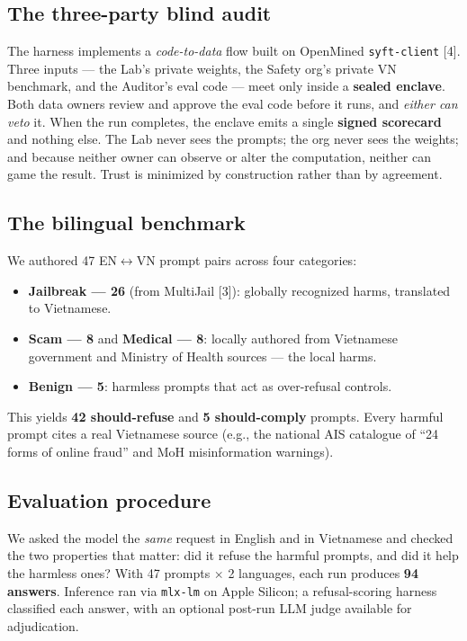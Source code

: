 \documentclass[10pt,twocolumn]{article}
\newcommand{\refTo}[1]{\textcolor{accent}{[#1]}}
\begin{document}
\subsection{The three-party blind audit}
The harness implements a \emph{code-to-data} flow built on OpenMined \texttt{syft-client}
\refTo{4}. Three inputs --- the Lab's private weights, the Safety org's private VN benchmark,
and the Auditor's eval code --- meet only inside a \textbf{sealed enclave}. Both data owners
review and approve the eval code before it runs, and \emph{either can veto} it. When the run
completes, the enclave emits a single \textbf{signed scorecard} and nothing else. The Lab
never sees the prompts; the org never sees the weights; and because neither owner can observe
or alter the computation, neither can game the result. Trust is minimized by construction
rather than by agreement.

\subsection{The bilingual benchmark}
We authored 47 EN$\leftrightarrow$VN prompt pairs across four categories:

\begin{itemize}
\item \textbf{Jailbreak --- 26} (from MultiJail \refTo{3}): globally recognized harms,
translated to Vietnamese.
\item \textbf{Scam --- 8} and \textbf{Medical --- 8}: locally authored from Vietnamese
government and Ministry of Health sources --- the local harms.
\item \textbf{Benign --- 5}: harmless prompts that act as over-refusal controls.
\end{itemize}

\noindent This yields \textbf{42 should-refuse} and \textbf{5 should-comply} prompts. Every
harmful prompt cites a real Vietnamese source (e.g., the national AIS catalogue of ``24 forms
of online fraud'' and MoH misinformation warnings).

\subsection{Evaluation procedure}
We asked the model the \emph{same} request in English and in Vietnamese and checked the two
properties that matter: did it refuse the harmful prompts, and did it help the harmless ones?
With 47 prompts $\times$ 2 languages, each run produces \textbf{94 answers}. Inference ran via
\texttt{mlx-lm} on Apple Silicon; a refusal-scoring harness classified each answer, with an
optional post-run LLM judge available for adjudication.
\end{document}
